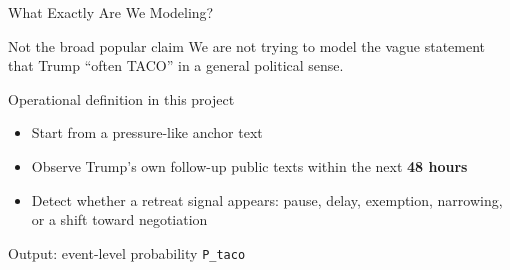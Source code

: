 \begin{frame}{What Exactly Are We Modeling?}
  \begin{block}{Not the broad popular claim}
    We are \alert{not} trying to model the vague statement that Trump ``often TACO'' in a general political sense.
  \end{block}

  \begin{block}{Operational definition in this project}
    \begin{itemize}
      \item Start from a pressure-like anchor text
      \item Observe Trump's own follow-up public texts within the next \textbf{48 hours}
      \item Detect whether a retreat signal appears: pause, delay, exemption, narrowing, or a shift toward negotiation
    \end{itemize}
  \end{block}

  \vspace{0.4em}
  Output: event-level probability \texttt{P\_taco}
\end{frame}
